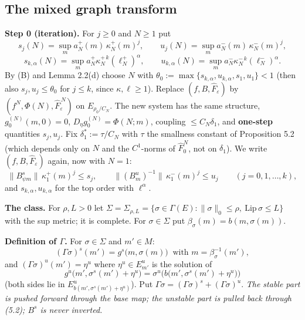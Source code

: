 \documentclass[11pt,a4paper]{article}
\theoremstyle{plain}
\theoremstyle{definition}
\theoremstyle{remark}
\numberwithin{equation}{section}
\numberwithin{figure}{section}
\begin{document}
\subsection{The mixed graph transform}

\textbf{Step 0 (iteration).} For $j\ge0$ and $N\ge1$ put
\[
s_j(N)=\sup_m a^+_N(m)\,\kappa^+_N(m)^j,\qquad
u_j(N)=\sup_ma^-_N(m)\,\kappa^-_N(m)^j,
\]
\[
s_{k,\alpha}(N)=\sup_ma^+_N\kappa_N^{+\,k}(\ell^+_N)^\alpha,\qquad
u_{k,\alpha}(N)=\sup_ma^-_N\kappa_N^{-\,k}(\ell^-_N)^\alpha .
\]
By (B) and Lemma 2.2(d) choose $N$ with $\theta_0:=\max\{s_{k,\alpha},u_{k,\alpha},s_1,u_1\}<1$ (then also $s_j,u_j\le\theta_0$ for $j\le k$, since $\kappa,\ell\ge1$). Replace $(f,B,\widehat F_\varepsilon)$ by $(f^N,\Phi(N),\widehat F_\varepsilon^{\,N})$ on $E_{\rho_0/C_N}$. The new system has the same structure, $g^{(N)}_0(m,0)=0$, $D_\eta g_0^{(N)}=\Phi(N;m)$, coupling $\le C_N\delta_1$, and \textbf{one-step} quantities $s_j,u_j$. Fix $\delta_1^*:=\tau/C_N$ with $\tau$ the smallness constant of Proposition 5.2 (which depends only on $N$ and the $C^1$-norms of $\widehat F_0^N$, not on $\delta_1$). We write $(f,B,\widehat F_\varepsilon)$ again, now with $N=1$:
\[
\|B^s_{\psi m}\|\,\kappa^+_1(m)^j\le s_j,\qquad\|(B^u_m)^{-1}\|\,\kappa^-_1(m)^j\le u_j\qquad(j=0,1,\dots,k),
\]
and $s_{k,\alpha},u_{k,\alpha}$ for the top order with $\ell^\alpha$.

\textbf{The class.} For $\rho,L>0$ let $\Sigma=\Sigma_{\rho,L}=\{\sigma\in\Gamma(E):\|\sigma\|_0\le\rho,\ \mathrm{Lip}\,\sigma\le L\}$ with the sup metric; it is complete. For $\sigma\in\Sigma$ put $\beta_\sigma(m)=b(m,\sigma(m))$.

\textbf{Definition of $\Gamma$.} For $\sigma\in\Sigma$ and $m'\in M$:
\[
(\Gamma\sigma)^s(m')=g^s\big(m,\sigma(m)\big)\ \text{ with } m=\beta_\sigma^{-1}(m'),\tag{5.1}
\]
and $(\Gamma\sigma)^u(m')=\eta^u$ where $\eta^u\in E^u_{m'}$ is the solution of
\[
g^u\big(m',\sigma^s(m')+\eta^u\big)=\sigma^u\Big(b\big(m',\sigma^s(m')+\eta^u\big)\Big)\tag{5.2}
\]
(both sides lie in $E^u_{b(m',\sigma^s(m')+\eta^u)}$). Put $\Gamma\sigma=(\Gamma\sigma)^s+(\Gamma\sigma)^u$. \textit{The stable part is pushed forward through the base map; the unstable part is pulled back through (5.2); $B^s$ is never inverted.}
\end{document}
